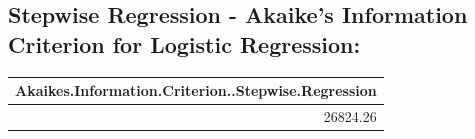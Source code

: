 \documentclass[]{article}
\begin{document}
\hypertarget{stepwise-regression---akaikes-information-criterion-for-logistic-regression}{%
\subsection{\texorpdfstring{\textbf{Stepwise Regression - Akaike's
Information Criterion for Logistic
Regression:}}{Stepwise Regression - Akaike's Information Criterion for Logistic Regression:}}\label{stepwise-regression---akaikes-information-criterion-for-logistic-regression}}

\begin{longtable}[]{@{}r@{}}
\toprule
Akaikes.Information.Criterion..Stepwise.Regression\tabularnewline
\midrule
\endhead
26824.26\tabularnewline
\bottomrule
\end{longtable}
\end{document}
